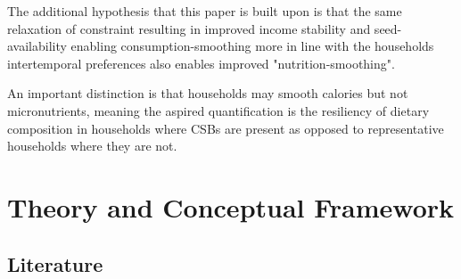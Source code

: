 \documentclass{article}
\begin{document}
The additional hypothesis that this paper is built upon is that the same relaxation of constraint resulting in improved income stability and seed-availability enabling consumption-smoothing more in line with the households intertemporal preferences also enables improved "nutrition-smoothing".

An important distinction is that households may smooth calories but not micronutrients, meaning the aspired quantification is the resiliency of dietary composition in households where CSBs are present as opposed to representative households where they are not. 

\section{Theory and Conceptual Framework}

\subsection{Literature}
\end{document}
